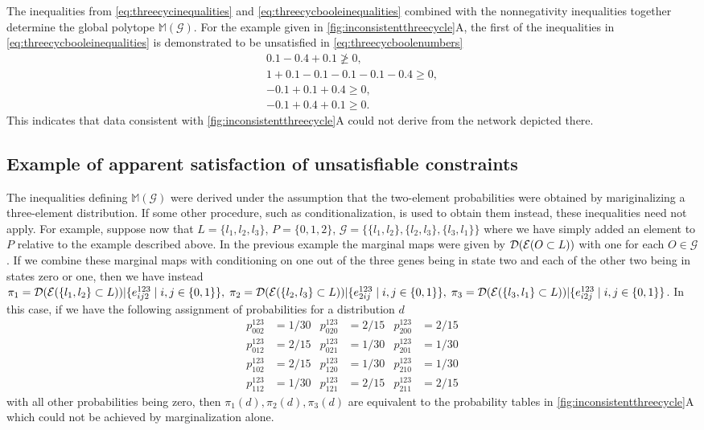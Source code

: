The inequalities from \ref{eq:threecycinequalities} and \ref{eq:threecycbooleinequalities} combined with the nonnegativity inequalities together determine the global polytope $\mathbb{M}(\mathcal{G})$. For the example given in \ref{fig:inconsistentthreecycle}A, the first of the inequalities in \ref{eq:threecycbooleinequalities} is demonstrated to be unsatisfied in \ref{eq:threecycboolenumbers}
\begin{equation}
\begin{aligned}\label{eq:threecycboolenumbers}
0.1 - 0.4 + 0.1 \not\geq 0, \\
1 + 0.1 - 0.1 - 0.1 - 0.1 - 0.4 \geq 0, \\
-0.1 + 0.1 + 0.4 \geq 0, \\
-0.1 + 0.4 + 0.1 \geq 0.
\end{aligned}
\end{equation}
This indicates that data consistent with \ref{fig:inconsistentthreecycle}A could not derive from the network depicted there.
\subsection{Example of apparent satisfaction of unsatisfiable constraints}\label{sec:apparentinconsistency}
The inequalities defining $\mathbb{M}(\mathcal{G})$ were derived under the assumption that the two-element probabilities were obtained by mariginalizing a three-element distribution.  If some other procedure, such as conditionalization, is used to obtain them instead, these inequalities need not apply. For example, suppose now that $L = \{l_1,l_2,l_3 \}$, $P = \{0,1,2\}$, $\mathcal{G} = \{\{l_1,l_2\},\{l_2,l_3\},\{l_3,l_1\}\}$ where we have simply added an element to $P$ relative to the example described above. In the previous example the marginal maps were given by $\mathcal{D} (\mathcal{E} (O \subset L))$ with one for each $O \in \mathcal{G}$. If we combine these marginal maps with conditioning on one out of the three genes being in state two and each of the other two being in states zero or one, then we have instead $\pi_1 = \mathcal{D} (\mathcal{E} (\{l_1,l_2\} \subset L))|\{ e^{123}_{ij2} \mid i,j \in \{ 0,1 \} \},\; \pi_2 = \mathcal{D} (\mathcal{E} (\{l_2,l_3\} \subset L))|\{ e^{123}_{2ij} \mid i,j \in \{ 0,1 \} \},\; \pi_3 = \mathcal{D} (\mathcal{E} (\{l_3,l_1\} \subset L))|\{ e^{123}_{i2j} \mid i,j \in \{ 0,1 \} \}$. In this case, if we have the following assignment of probabilities for a distribution $d$
\begin{equation}\label{eq:condprobs}
\begin{aligned}
p^{123}_{002} &= 1/30 & p^{123}_{020} &= 2/15 & p^{123}_{200} &= 2/15\\
p^{123}_{012} &= 2/15 & p^{123}_{021} &= 1/30 & p^{123}_{201} &= 1/30\\
p^{123}_{102} &= 2/15 & p^{123}_{120} &= 1/30 & p^{123}_{210} &= 1/30\\
p^{123}_{112} &= 1/30 & p^{123}_{121} &= 2/15 & p^{123}_{211} &= 2/15
\end{aligned}
\end{equation}
with all other probabilities being zero, then $\pi_1(d), \pi_2(d), \pi_3(d)$ are equivalent to the probability tables in \ref{fig:inconsistentthreecycle}A which could not be achieved by marginalization alone.


